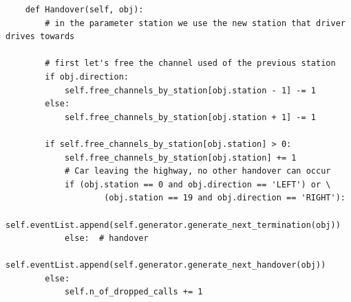 \documentclass[12pt,a4paper]{article}
\begin{document}
\begin{lstlisting}
    def Handover(self, obj):
        # in the parameter station we use the new station that driver drives towards

        # first let's free the channel used of the previous station
        if obj.direction:
            self.free_channels_by_station[obj.station - 1] -= 1
        else:
            self.free_channels_by_station[obj.station + 1] -= 1

        if self.free_channels_by_station[obj.station] > 0:
            self.free_channels_by_station[obj.station] += 1
            # Car leaving the highway, no other handover can occur
            if (obj.station == 0 and obj.direction == 'LEFT') or \
                    (obj.station == 19 and obj.direction == 'RIGHT'):
                self.eventList.append(self.generator.generate_next_termination(obj))
            else:  # handover
                self.eventList.append(self.generator.generate_next_handover(obj))
        else:
            self.n_of_dropped_calls += 1
\end{lstlisting}
\end{document}
